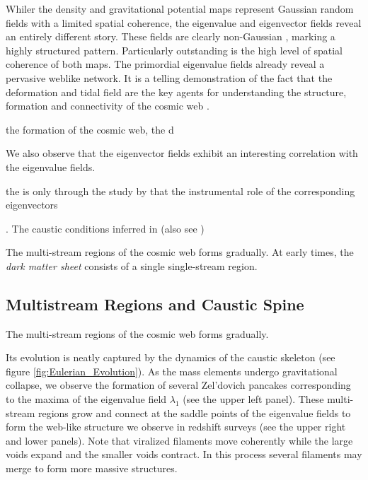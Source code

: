 \documentclass[a4paper, 11pt]{article}
\begin{document}
Whiler the density and gravitational potential maps represent Gaussian
random fields with a limited spatial coherence,
the eigenvalue and eigenvector fields reveal an entirely different
story. These fields are clearly non-Gaussian
\citep[see][]{doroshkevich1970}, marking a highly structured pattern.
Particularly outstanding is the high level of spatial
coherence of both maps. The primordial eigenvalue fields already reveal
a pervasive weblike network. It is a telling demonstration of the fact
that the deformation and tidal field are the key agents for
understanding the structure, formation and connectivity
of the cosmic web \citep[also see][]{wilding2022}.



the formation of the cosmic web, the d


We also observe that the eigenvector fields
exhibit an interesting correlation with the eigenvalue fields.


the is only through the study by \cite{feldbrugge2019} that the
instrumental role of the corresponding eigenvectors



. The caustic conditions inferred in \citep{feldbrugge2019} (also see
\cite{hidding2014})



The multi-stream regions of the cosmic web forms gradually. At early
times, the {\it dark matter sheet} consists of a
single single-stream region.






\subsection{Multistream Regions and Caustic Spine}
The multi-stream regions of the cosmic web forms gradually.

Its evolution is neatly captured by the dynamics of the caustic skeleton
(see figure \ref{fig:Eulerian_Evolution}). As the mass elements undergo
gravitational collapse, we observe the formation of several Zel'dovich
pancakes corresponding to the maxima of the eigenvalue field $\lambda_1$
(see the upper left panel). These multi-stream regions grow and connect
at the saddle points of the eigenvalue fields to form the web-like
structure we observe in redshift surveys (see the upper right and lower
panels). Note that viralized filaments move coherently while the large
voids expand and the smaller voids contract. In this process several
filaments may merge to form more massive structures.
\end{document}
